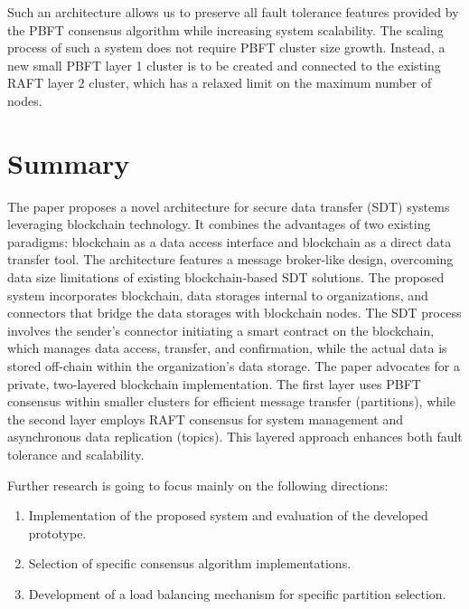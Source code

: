 \documentclass[10pt]{llncs}
\begin{document}
Such an architecture allows us to preserve all fault tolerance features provided by the PBFT consensus algorithm while increasing system scalability.
The scaling process of such a system does not require PBFT cluster size growth. 
Instead, a new small PBFT layer 1 cluster is to be created and connected to the existing RAFT layer 2 cluster, which has a relaxed limit on the maximum number of nodes.
\section{Summary} \label{summary}

The paper proposes a novel architecture for secure data transfer (SDT) systems leveraging blockchain technology.
It combines the advantages of two existing paradigms: blockchain as a data access interface and blockchain as a direct data transfer tool.
The architecture features a message broker-like design, overcoming data size limitations of existing blockchain-based SDT solutions.
The proposed system incorporates blockchain, data storages internal to organizations, and connectors that bridge the data storages with blockchain nodes.
The SDT process involves the sender's connector initiating a smart contract on the blockchain, which manages data access, transfer, and confirmation, while the actual data is stored off-chain within the organization's data storage. The paper advocates for a private, two-layered blockchain implementation.
The first layer uses PBFT consensus within smaller clusters for efficient message transfer (partitions), while the second layer employs RAFT consensus for system management and asynchronous data replication (topics).
This layered approach enhances both fault tolerance and scalability.

Further research is going to focus mainly on the following directions:

\begin{enumerate}
    \item Implementation of the proposed system and evaluation of the developed prototype.
    \item Selection of specific consensus algorithm implementations.
    \item Development of a load balancing mechanism for specific partition selection.
\end{enumerate}



\end{document}
